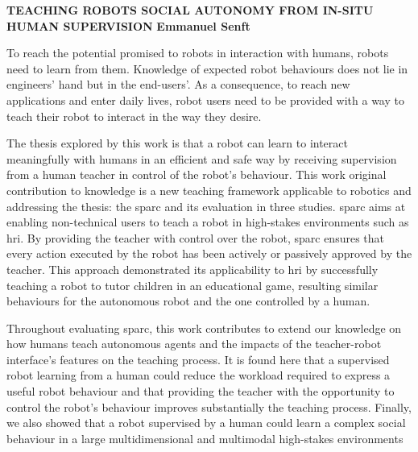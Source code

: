 \textbf{TEACHING ROBOTS SOCIAL AUTONOMY FROM IN-SITU HUMAN SUPERVISION}\newline
\textbf{Emmanuel Senft}

To reach the potential promised to robots in interaction with humans, robots need to learn from them. Knowledge of expected robot behaviours does not lie in engineers' hand but in the end-users'. As a consequence, to reach new applications and enter daily lives, robot users need to be provided with a way to teach their robot to interact in the way they desire.

The thesis explored by this work is that a robot can learn to interact meaningfully with humans in an efficient and safe way by receiving supervision from a human teacher in control of the robot's behaviour. This work original contribution to knowledge is a new teaching framework applicable to robotics and addressing the thesis: the \gls{sparc} and its evaluation in three studies. \gls{sparc} aims at enabling non-technical users to teach a robot in high-stakes environments such as \gls{hri}. By providing the teacher with control over the robot, \gls{sparc} ensures that every action executed by the robot has been actively or passively approved by the teacher. This approach demonstrated its applicability to \gls{hri} by successfully teaching a robot to tutor children in an educational game, resulting similar behaviours for the autonomous robot and the one controlled by a human. 

Throughout evaluating \gls{sparc}, this work contributes to extend our knowledge on how humans teach autonomous agents and the impacts of the teacher-robot interface's features on the teaching process. It is found here that a supervised robot learning from a human could reduce the workload required to express a useful robot behaviour and that providing the teacher with the opportunity to control the robot's behaviour improves substantially the teaching process. Finally, we also showed that a robot supervised by a human could learn a complex social behaviour in a large multidimensional and multimodal high-stakes environments

